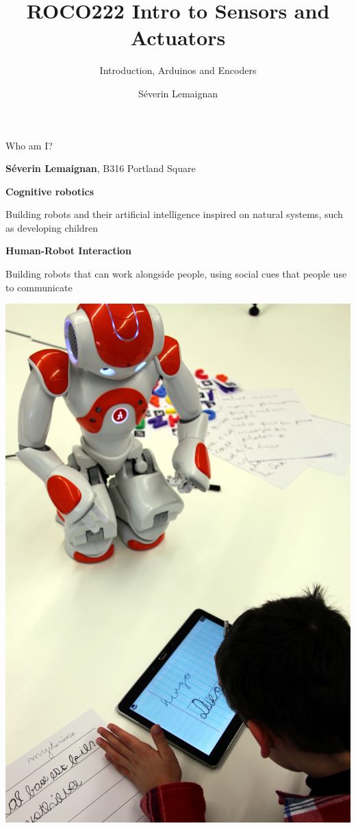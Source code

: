 \documentclass[compress]{beamer}
\title{ROCO222 \newline Intro to Sensors and Actuators}
\subtitle{Introduction, Arduinos and Encoders}
\date{}
\author{Séverin Lemaignan}
\institute{Centre for Neural Systems and Robotics\\{\bf Plymouth University}}
\begin{document}

\maketitle


\begin{frame}{Who am I?}

\begin{center}
    \textbf{Séverin Lemaignan}, B316 Portland Square
\end{center}

\begin{multicols}{2}

    \textbf{Cognitive robotics}

  Building robots and their artificial intelligence inspired on natural
  systems, such as developing children

    \textbf{Human-Robot Interaction}

  Building robots that can work alongside people, using social cues that
  people use to communicate

    \begin{center}
        \includegraphics[width=0.7\linewidth]{cowriter}
    \end{center}

\end{multicols}
\end{frame}
\end{document}
